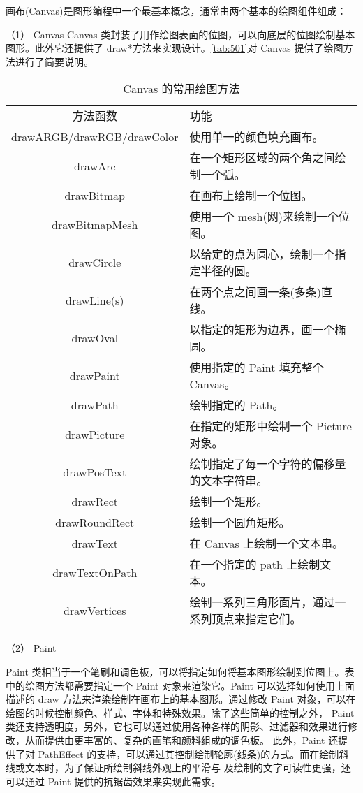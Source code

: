 画布(Canvas)是图形编程中一个最基本概念，通常由两个基本的绘图组件组成： 

（1）	Canvas  
Canvas 类封装了用作绘图表面的位图，可以向底层的位图绘制基本图形。此外它还提供了 draw*方法来实现设计。\autoref{tab:501}对 Canvas 提供了绘图方法进行了简要说明。 

\begin{table}[htbp]
    \caption{\label{tab:501}Canvas 的常用绘图方法}
    \begin{tabularx}{\linewidth}{cX<{\centering}}
        \hline
        方法函数 &  功能\\
        drawARGB/drawRGB/drawColor 	&   使用单一的颜色填充画布。 \\
        drawArc 	&   在一个矩形区域的两个角之间绘制一个弧。  \\
        drawBitmap 	&   在画布上绘制一个位图。                   \\
        drawBitmapMesh 	&   使用一个 mesh(网)来绘制一个位图。  \\
        drawCircle 	&   以给定的点为圆心，绘制一个指定半径的圆。  \\
        drawLine(s) 	&   在两个点之间画一条(多条)直线。  \\
        drawOval 	&   以指定的矩形为边界，画一个椭圆。  \\
        drawPaint 	&   使用指定的 Paint 填充整个 Canvas。  \\
        drawPath 	&   绘制指定的 Path。  \\
        drawPicture 	&   在指定的矩形中绘制一个 Picture 对象。  \\
        drawPosText 	&   绘制指定了每一个字符的偏移量的文本字符串。  \\
        drawRect 	&   绘制一个矩形。  \\
        drawRoundRect 	&   绘制一个圆角矩形。  \\
        drawText 	&   在 Canvas 上绘制一个文本串。  \\
        drawTextOnPath 	&   在一个指定的 path 上绘制文本。  \\
        drawVertices 	&   绘制一系列三角形面片，通过一系列顶点来指定它们。  \\
    \end{tabularx}
\end{table}

（2）	Paint  

Paint 类相当于一个笔刷和调色板，可以将指定如何将基本图形绘制到位图上。表中的绘图方法都需要指定一个 Paint 对象来渲染它。Paint 可以选择如何使用上面描述的 
draw 方法来渲染绘制在画布上的基本图形。通过修改 Paint 对象，可以在绘图的时候控制颜色、样式、字体和特殊效果。除了这些简单的控制之外，
Paint 类还支持透明度，另外，它也可以通过使用各种各样的阴影、过滤器和效果进行修改，从而提供由更丰富的、复杂的画笔和颜料组成的调色板。
此外，Paint 还提供了对 PathEffect 的支持，可以通过其控制绘制轮廓(线条)的方式。而在绘制斜线或文本时，为了保证所绘制斜线外观上的平滑与
及绘制的文字可读性更强，还可以通过 Paint 提供的抗锯齿效果来实现此需求。 


